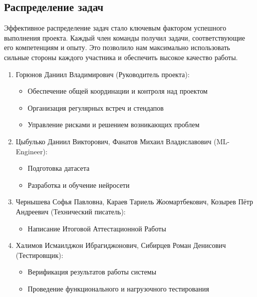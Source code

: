     \subsection{Распределение задач}
    Эффективное распределение задач стало ключевым фактором успешного выполнения проекта. Каждый член команды получил задачи, соответствующие его компетенциям и опыту. Это позволило нам максимально использовать сильные стороны каждого участника и обеспечить высокое качество работы.
    \begin{enumerate}
        \item Горюнов Даниил Владимирович (Руководитель проекта):
            \begin{itemize}
                \item Обеспечение общей координации и контроля над проектом
                \item Организация регулярных встреч и стендапов
                \item Управление рисками и решением возникающих проблем
            \end{itemize}
        \item Цыбулько Даниил Викторович, Фанатов Михаил Владиславович (ML-Engineer):
            \begin{itemize}
                \item Подготовка датасета
                \item Разработка и обучение нейросети
            \end{itemize}
        \item Чернышева Софья Павловна, Караев Тариель Жоомартбекович, Козырев Пётр Андреевич (Технический писатель):
            \begin{itemize}
                \item Написание Итоговой Аттестационной Работы
            \end{itemize}
        \item Халимов Исмаилджон Ибрагиджонович, Сибирцев Роман Денисович (Тестировщик):
            \begin{itemize}
                \item Верификация результатов работы системы 
                \item Проведение функционального и нагрузочного тестирования
            \end{itemize}
    \end{enumerate}

